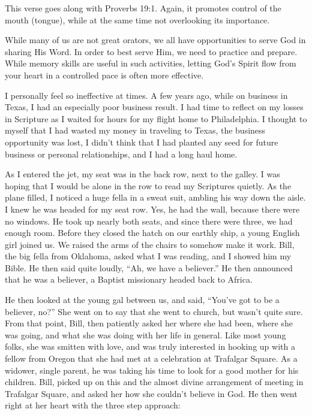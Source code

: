 \documentclass[12pt]{memoir}
\begin{document}
This verse goes along with Proverbs 19:1. Again, it promotes control of the mouth (tongue), while at the same time not overlooking its importance.

While many of us are not great orators, we all have opportunities
to serve God in sharing His Word. In order to best serve Him, we need
to practice and prepare. While memory skills are useful in such activities,
letting God's Spirit flow from your heart in a controlled pace is
often more effective.

I personally feel so ineffective at times. A few years ago, while
on business in Texas, I had an especially poor business result. I
had time to reflect on my losses in Scripture as I waited for hours
for my flight home to Philadelphia. I thought to myself that I had
wasted my money in traveling to Texas, the business opportunity was
lost, I didn't think that I had planted any seed for future
business or personal relationships, and I had a long haul home.

As I entered the jet, my seat was in the back row, next to the galley.
I was hoping that I would be alone in the row to read my Scriptures
quietly. As the plane filled, I noticed a huge fella in a sweat suit,
ambling his way down the aisle. I knew he was headed for my seat row.
Yes, he had the wall, because there were no windows. He took up nearly
both seats, and since there were three, we had enough room. Before
they closed the hatch on our earthly ship, a young English girl joined
us. We raised the arms of the chairs to somehow make it work. Bill,
the big fella from Oklahoma, asked what I was reading, and I showed
him my Bible. He then said quite loudly, ``Ah, we have a believer.''
He then announced that he was a believer, a Baptist missionary headed
back to Africa.

He then looked at the young gal between us, and said, ``You've got
to be a believer, no?'' She went on to say that she went to church,
but wasn't quite sure. From that point, Bill, then patiently asked
her where she had been, where she was going, and what she was doing
with her life in general. Like most young folks, she was smitten with
love, and was truly interested in hooking up with a fellow from Oregon
that she had met at a celebration at Trafalgar Square. As a widower,
single parent, he was taking his time to look for a good mother for
his children. Bill, picked up on this and the almost divine arrangement
of meeting in Trafalgar Square, and asked her how she couldn't believe
in God. He then went right at her heart with the three step approach: 
\end{document}
